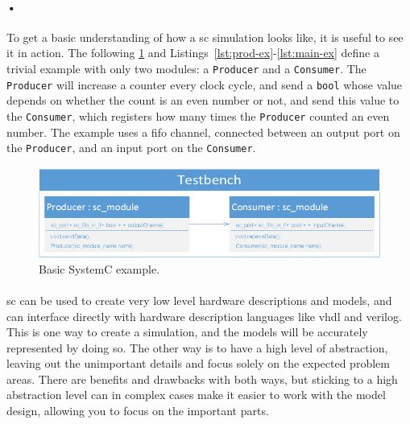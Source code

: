 \documentclass[a4paper, 12pt]{report}
\newcommand{\codeword}[1]{\texttt{#1}}
\begin{document}
\paragraph{•}
To get a basic understanding of how a \gls{sc} simulation looks like, it is useful to see it in action.
The following \ref{fig:sc-ex} and Listings~\ref{lst:prod-ex}-\ref{lst:main-ex} define a trivial example with only two modules: a \codeword{Producer} and a \codeword{Consumer}.
The \codeword{Producer} will increase a counter every clock cycle, and send a \codeword{bool} whose value depends on whether the count is an even number or not, and send this value to the \codeword{Consumer}, which registers how many times the \codeword{Producer} counted an even number.
The example uses a \gls{fifo} channel, connected between an output port on the \codeword{Producer}, and an input port on the \codeword{Consumer}.

\begin{figure}[h!]
  \centering
    \includegraphics[width=1.0\textwidth]{images/sc-example.png}
     \caption{Basic SystemC example.}
    \label{fig:sc-ex}
\end{figure}

\noindent
\begin{minipage}{\linewidth}

\end{minipage}

\begin{minipage}{\linewidth}

\end{minipage}

\begin{minipage}{\linewidth}

\end{minipage}

\paragraph{}
\gls{sc} can be used to create very low level hardware descriptions and models, and can interface directly with hardware description languages like \gls{vhdl} and \gls{verilog}.
This is one way to create a simulation, and the models will be accurately represented by doing so.
The other way is to have a high level of abstraction, leaving out the unimportant details and focus solely on the expected problem areas.
There are benefits and drawbacks with both ways, but sticking to a high abstraction level can in complex cases make it easier to work with the model design, allowing you to focus on the important parts.
\end{document}
